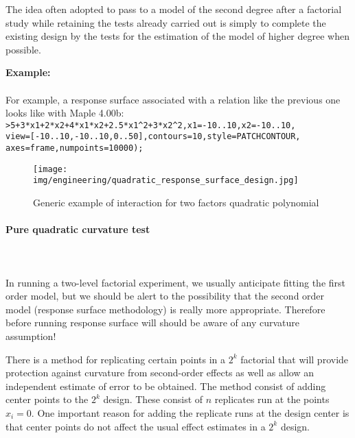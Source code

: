 	The idea often adopted to pass to a model of the second degree after a factorial study while retaining the tests already carried out is simply to complete the existing design by the tests for the estimation of the model of higher degree when possible.
	\begin{tcolorbox}[colframe=black,colback=white,sharp corners]
	\textbf{{\Large {}}Example:}\\\\
	For example, a response surface associated with a relation like the previous one looks like with Maple 4.00b:\\
	
	\texttt{>5+3*x1+2*x2+4*x1*x2+2.5*x1\string^2+3*x2\string^2,x1=-10..10,x2=-10..10,\\
view=[-10..10,-10..10,0..50],contours=10,style=PATCHCONTOUR,\\
		axes=frame,numpoints=10000);
		}
	\begin{figure}[H]
		\begin{center}
		\texttt{[image: img/engineering/quadratic\_response\_surface\_design.jpg]}
		\end{center}	
		\caption{Generic example of interaction for two factors quadratic polynomial}
	\end{figure}
	\end{tcolorbox}
	
	\pagebreak
	\paragraph{Pure quadratic curvature test}\mbox{}\\\\
	In running a two-level factorial experiment, we usually anticipate fitting the first order model, but we should be alert to the possibility that the second order model (response surface methodology) is really more appropriate. Therefore before running response surface will should be aware of any curvature assumption!
	
	 There is a method for replicating certain points in a $2^k$ factorial that will provide protection against curvature from second-order effects as well as allow an independent estimate of error to be obtained. The method consist of adding center points to the $2^k$ design. These consist of $n$ replicates run at the points $x_i=0$. One important reason for adding the replicate runs at the design center is that center points do not affect the usual effect estimates in a $2^k$ design.
	

